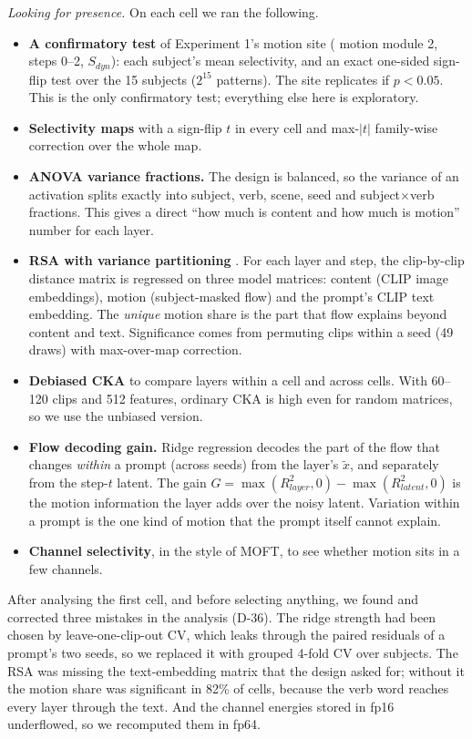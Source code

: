 \documentclass[twoside,english]{article}
\newcommand{\xd}{\tilde{x}}       %
\begin{document}
\emph{Looking for presence.} On each cell we ran the following.
\begin{itemize}
\item \textbf{A confirmatory test} of Experiment 1's motion site ( motion module 2,
  steps 0--2, $S_{dyn}$): each subject's mean selectivity, and an exact one-sided sign-flip test over
  the 15 subjects ($2^{15}$ patterns). The site replicates if $p < 0.05$. This is the only
  confirmatory test; everything else here is exploratory.
\item \textbf{Selectivity maps} with a sign-flip $t$ in every cell and max-$|t|$ family-wise
  correction over the whole map.
\item \textbf{ANOVA variance fractions.} The design is balanced, so the variance of an activation
  splits exactly into subject, verb, scene, seed and subject$\times$verb fractions. This gives a direct
  ``how much is content and how much is motion'' number for each layer.
\item \textbf{RSA with variance partitioning} \citep{kriegeskorte2008rsa}. For each layer and step,
  the clip-by-clip distance matrix is regressed on three model matrices: content (CLIP image
  embeddings), motion (subject-masked flow) and the prompt's CLIP text embedding. The \emph{unique}
  motion share is the part that flow explains beyond content and text. Significance comes from
  permuting clips within a seed (49 draws) with max-over-map correction.
\item \textbf{Debiased CKA} \citep{kornblith2019cka} to compare layers within a cell and across cells.
  With 60--120 clips and 512 features, ordinary CKA is high even for random matrices, so we use the
  unbiased version.
\item \textbf{Flow decoding gain.} Ridge regression decodes the part of the flow that changes
  \emph{within} a prompt (across seeds) from the layer's $\xd$, and separately from the step-$t$
  latent. The gain $G = \max(R^2_{layer},0) - \max(R^2_{latent},0)$ is the motion information the layer
  adds over the noisy latent. Variation within a prompt is the one kind of motion that the prompt
  itself cannot explain.
\item \textbf{Channel selectivity}, in the style of MOFT, to see whether motion sits in a few channels.
\end{itemize}
After analysing the first cell, and before selecting anything, we found and corrected three mistakes
in the analysis (D-36). The ridge strength had been chosen by leave-one-clip-out CV, which leaks through
the paired residuals of a prompt's two seeds, so we replaced it with grouped 4-fold CV over subjects.
The RSA was missing the text-embedding matrix that the design asked for; without it the motion share
was significant in 82\% of cells, because the verb word reaches every layer through the text. And the
channel energies stored in fp16 underflowed, so we recomputed them in fp64.
\end{document}
